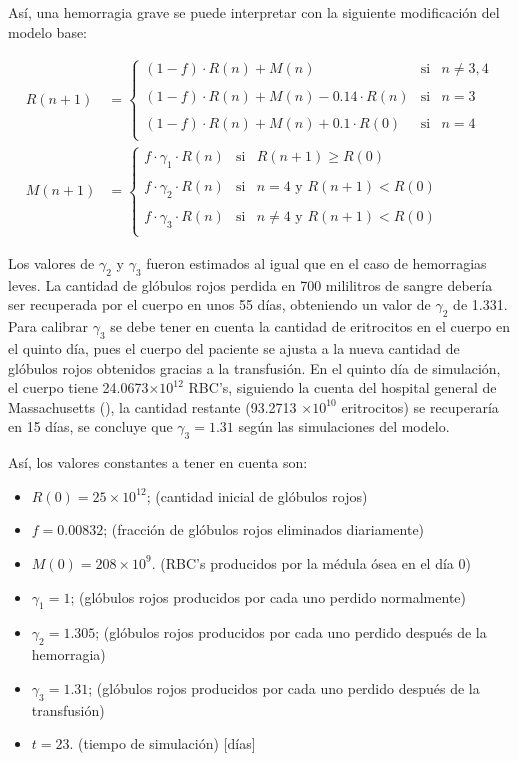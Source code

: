 Así, una hemorragia grave se puede interpretar con la siguiente modificación del modelo base:

\begin{align}\label{eq:HemoGrave}
    R(n+1) &= \left\{ \begin{array}{lcc} (1-f)\cdot R(n)+M(n) & \textrm{si} & n \neq 3,4 \\ \\ (1-f)\cdot R(n)+M(n)-0.14\cdot R(n) & \textrm{si} & n = 3 \\ \\ (1-f)\cdot R(n)+M(n)+0.1\cdot R(0) & \textrm{si} & n = 4 \\ \end{array} \right. \\
    M(n+1) &=\left\{ \begin{array}{lcc} f\cdot \gamma_1 \cdot R(n) & \textrm{si} & R(n+1) \geq R(0) \\ \\ f\cdot \gamma_2\cdot R(n) & \textrm{si} & n = 4\textrm{ y } R(n+1)<R(0) \\ \\ f\cdot \gamma_3\cdot R(n) & \textrm{si} & n \neq 4\textrm{ y } R(n+1)<R(0)\\ \end{array} \right. \nonumber
\end{align}

Los valores de $\gamma_2$ y $\gamma_3$ fueron estimados al igual que en el caso de hemorragias leves. La cantidad de glóbulos rojos perdida en 700 mililitros de sangre debería ser recuperada por el cuerpo en unos 55 días, obteniendo un valor de $\gamma_2$ de 1.331. Para calibrar $\gamma_3$ se debe tener en cuenta la cantidad de eritrocitos en el cuerpo en el quinto día, pues el cuerpo del paciente se ajusta a la nueva cantidad de glóbulos rojos obtenidos gracias a la transfusión. En el quinto día de simulación, el cuerpo tiene 24.0673$\times 10^{12}$ RBC's, siguiendo la cuenta del hospital general de Massachusetts (\cite{Massachusetts}), la cantidad restante (93.2713 $\times 10^{10}$ eritrocitos) se recuperaría en 15 días, se concluye que $\gamma_3 = 1.31$ según las simulaciones del modelo.

Así, los valores constantes a tener en cuenta son:
\begin{itemize}
    \item $R(0) = 25\times 10^{12}$; (cantidad inicial de glóbulos rojos)
    \item $f=0.00832$; (fracción de glóbulos rojos eliminados diariamente)
    \item $M(0) = 208 \times 10^{9}$. (RBC's producidos por la médula ósea en el día 0)
    \item $\gamma_1=1$; (glóbulos rojos producidos por cada uno perdido normalmente)
    \item $\gamma_2=1.305$; (glóbulos rojos producidos por cada uno perdido después de la hemorragia)
    \item $\gamma_3=1.31$; (glóbulos rojos producidos por cada uno perdido después de la transfusión)
    \item $t = 23$. (tiempo de simulación) [días]
\end{itemize}

